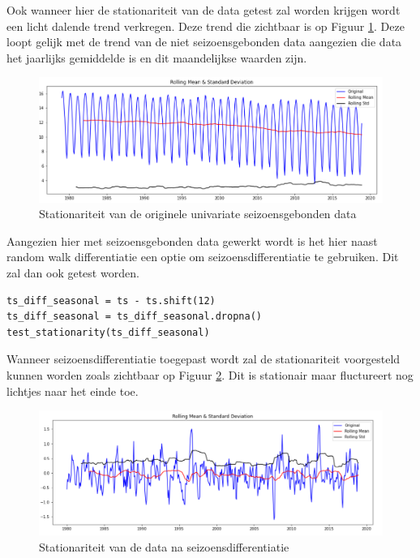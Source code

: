 Ook wanneer hier de stationariteit van de data getest zal worden krijgen wordt een licht dalende trend verkregen. Deze trend die zichtbaar is op Figuur \ref{fig:uvsstationarity}. Deze loopt gelijk met de trend van de niet seizoensgebonden data aangezien die data het jaarlijks gemiddelde is en dit maandelijkse waarden zijn.

\begin{figure}[!h]
    \centering
    \caption{Stationariteit van de originele univariate seizoensgebonden data}
    \label{fig:uvsstationarity}
    \includegraphics[width=1\linewidth]{uvsstationarity}
\end{figure}

Aangezien hier met seizoensgebonden data gewerkt wordt is het hier naast random walk differentiatie een optie om seizoensdifferentiatie te gebruiken. Dit zal dan ook getest worden. 

\clearpage
{}
\begin{verbatim}
ts_diff_seasonal = ts - ts.shift(12)
ts_diff_seasonal = ts_diff_seasonal.dropna()
test_stationarity(ts_diff_seasonal)
\end{verbatim}

Wanneer seizoensdifferentiatie toegepast wordt zal de stationariteit voorgesteld kunnen worden zoals zichtbaar op Figuur \ref{fig:uvsstationarityseasonal}. Dit is stationair maar fluctureert nog lichtjes naar het einde toe.

\begin{figure}[!h]
    \centering
    \caption{Stationariteit van de data na seizoensdifferentiatie}
    \label{fig:uvsstationarityseasonal}
    \includegraphics[width=1\linewidth]{uvsstationarityseasonal}
\end{figure}

